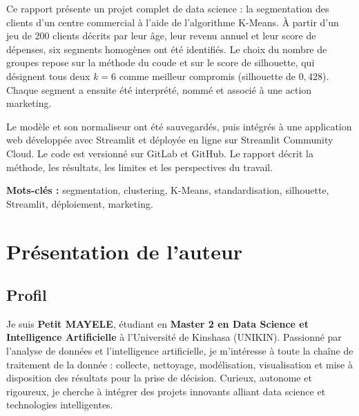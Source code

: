 \documentclass[11pt,a4paper]{article}
\begin{document}
Ce rapport présente un projet complet de data science : la segmentation des clients d'un centre commercial à l'aide de l'algorithme K-Means. À partir d'un jeu de 200 clients décrits par leur âge, leur revenu annuel et leur score de dépenses, six segments homogènes ont été identifiés. Le choix du nombre de groupes repose sur la méthode du coude et sur le score de silhouette, qui désignent tous deux $k=6$ comme meilleur compromis (silhouette de $0{,}428$). Chaque segment a ensuite été interprété, nommé et associé à une action marketing.

Le modèle et son normaliseur ont été sauvegardés, puis intégrés à une application web développée avec Streamlit et déployée en ligne sur Streamlit Community Cloud. Le code est versionné sur GitLab et GitHub. Le rapport décrit la méthode, les résultats, les limites et les perspectives du travail.

\medskip
\noindent\textbf{Mots-clés :} segmentation, clustering, K-Means, standardisation, silhouette, Streamlit, déploiement, marketing.

\tableofcontents
\listoffigures
\listoftables
\newpage

\section{Présentation de l'auteur}

\subsection{Profil}
Je suis \textbf{Petit MAYELE}, étudiant en \textbf{Master 2 en Data Science et Intelligence Artificielle} à l'Université de Kinshasa (UNIKIN). Passionné par l'analyse de données et l'intelligence artificielle, je m'intéresse à toute la chaîne de traitement de la donnée : collecte, nettoyage, modélisation, visualisation et mise à disposition des résultats pour la prise de décision. Curieux, autonome et rigoureux, je cherche à intégrer des projets innovants alliant data science et technologies intelligentes.
\end{document}
